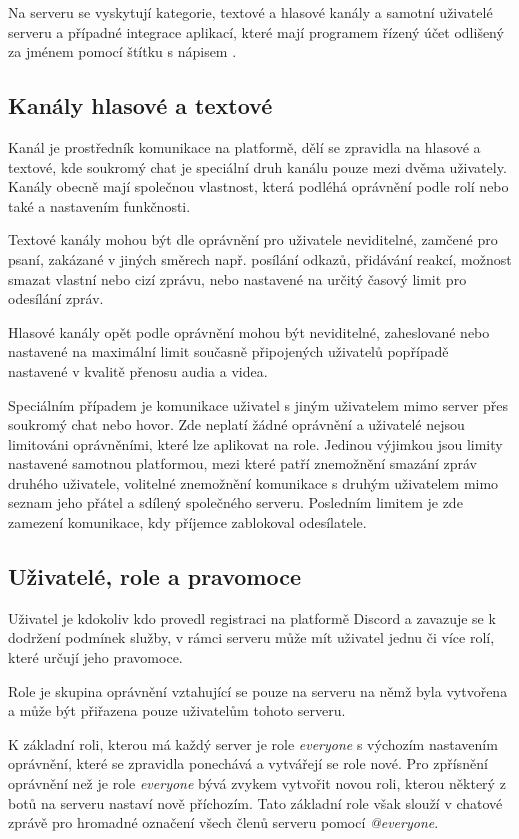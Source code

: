\documentclass[
  program=inf,
biblatex=false,
sourcecodes=true,
joinlists=true,
  figures=true,
  tables=true,
  glossaries=true,
  index=false
]{kidiplom}
\begin{document}
Na serveru se vyskytují kategorie, textové a hlasové kanály a samotní uživatelé serveru a případné
integrace aplikací, které mají programem řízený účet odlišený za jménem pomocí štítku s nápisem .

\subsection{Kanály hlasové a textové}
Kanál je prostředník komunikace na platformě, dělí se zpravidla na hlasové a textové, kde soukromý chat je speciální druh kanálu
pouze mezi dvěma uživately. Kanály obecně mají společnou vlastnost, která  
podléhá oprávnění podle rolí nebo také  a nastavením funkčnosti.

Textové kanály mohou být dle oprávnění pro uživatele neviditelné, zamčené pro psaní, zakázané v jiných
směrech např. posílání odkazů, přidávání reakcí, možnost smazat vlastní nebo cizí zprávu, nebo nastavené
na určitý časový limit pro odesílání zpráv.

Hlasové kanály opět podle oprávnění mohou být neviditelné, zaheslované nebo
nastavené na maximální limit současně připojených uživatelů popřípadě
nastavené v kvalitě přenosu audia a videa.

Speciálním případem je komunikace uživatel s jiným uživatelem mimo server přes soukromý chat nebo hovor.
Zde neplatí žádné oprávnění a uživatelé nejsou limitováni oprávněními, které lze aplikovat na role.
Jedinou výjimkou jsou limity nastavené samotnou platformou, mezi které patří znemožnění smazání zpráv druhého uživatele, volitelné znemožnění komunikace
s druhým uživatelem mimo seznam jeho přátel a sdílený společného serveru. Posledním limitem je zde zamezení komunikace, 
kdy příjemce zablokoval odesílatele.

\subsection{Uživatelé, role a pravomoce}
Uživatel je kdokoliv kdo provedl registraci na platformě Discord a zavazuje se
k dodržení podmínek služby, v rámci serveru může mít uživatel jednu či více rolí, které určují
jeho pravomoce.

Role je skupina oprávnění vztahující se pouze na serveru na němž byla vytvořena a může
být přiřazena pouze uživatelům tohoto serveru.

K základní roli, kterou má každý server je role {\it everyone} s výchozím nastavením
oprávnění, které se zpravidla ponechává a vytvářejí se role nové. Pro zpřísnění oprávnění
než je role {\it everyone} bývá zvykem vytvořit novou roli, kterou některý z botů
na serveru nastaví nově příchozím. Tato základní role však slouží v chatové zprávě
pro hromadné označení všech členů serveru pomocí {\it @everyone}.
\end{document}
